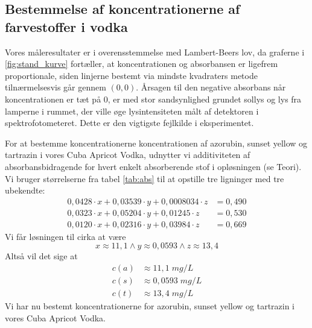 \documentclass[11pt]{article}
\theoremstyle{definition}
\begin{document}
\subsection{Bestemmelse af koncentrationerne af farvestoffer i vodka}
Vores måleresultater er i overensstemmelse med Lambert-Beers lov, da graferne i \cref{fig:stand_kurve} fortæller, at koncentrationen og absorbansen er ligefrem proportionale, siden linjerne bestemt via mindste kvadraters metode tilnærmelsesvis går gennem $(0,0)$.
Årsagen til den negative absorbans når koncentrationen er tæt på $0$, er med stor sandsynlighed grundet sollys og lys fra lamperne i rummet, der ville øge lysintensiteten målt af detektoren i spektrofotometeret. 
Dette er den vigtigste fejlkilde i eksperimentet.

For at bestemme koncentrationerne koncentrationen af azorubin, sunset yellow og tartrazin i vores Cuba Apricot Vodka, udnytter vi additiviteten af absorbansbidragende for hvert enkelt absorberende stof i opløsningen (se Teori).
Vi bruger størrelserne fra tabel \ref{tab:abs} til at opstille tre ligninger med tre ubekendte:
\begin{equation*}
\begin{split}
    0,0428\cdot x + 0,03539 \cdot y + 0,0008034\cdot z&=0,490 \\
 0,0323\cdot x + 0,05204\cdot y + 0,01245\cdot z&=0,530 \\
 0,0120\cdot x + 0,02316\cdot y + 0,03984\cdot z&=0,669 
\end{split}
\end{equation*}
Vi får løsningen til cirka at være
\[
x \approx11,1 \land y \approx0,0593\land z\approx13,4
\] 
Altså vil det sige at
\begin{equation*}
\begin{split}
  c(a)&\approx11,1 \;\unit{mg/L} \\ 
  c(s)&\approx 0,0593 \;\unit{mg/L} \\ 
  c(t)&\approx 13,4 \;\unit{mg/L}
\end{split}
\end{equation*}
Vi har nu bestemt koncentrationerne for azorubin, sunset yellow og tartrazin i vores Cuba Apricot Vodka.
\end{document}
